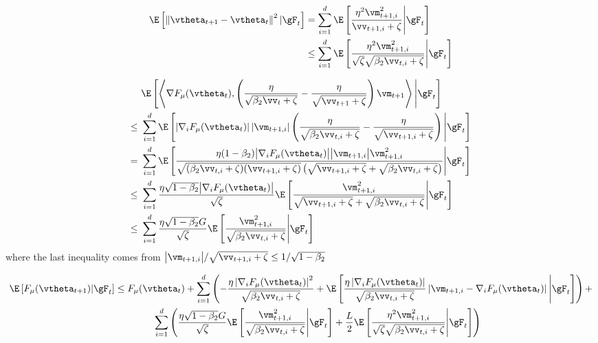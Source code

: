 \begin{equation}
\begin{aligned}
\E\left[\left\|\vtheta_{t+1}-\vtheta_{t}\right\|^2 | \gF_t\right] &= \sum_{i=1}^d \E\left[\frac{\eta^2\vm_{t+1,i}^2}{\vv_{t+1,i}+\zeta} \Bigg| \gF_t\right] \\
&\leq \sum_{i=1}^d \E\left[\frac{\eta^2\vm_{t+1,i}^2}{\sqrt{\zeta}\sqrt{\beta_2\vv_{t,i}+\zeta}} \Bigg| \gF_t\right]
\end{aligned}
\end{equation}

\begin{equation}
\begin{aligned}
&\,\,\E\left[\left\langle\nabla F_{\mu}(\vtheta_t), \left(\frac{\eta}{\sqrt{\beta_2\vv_t + \zeta}} - \frac{\eta}{\sqrt{\vv_{t+1} + \zeta}}\right) \vm_{t+1}\right\rangle \Bigg| \gF_t\right] \\
\leq&\,\,\sum_{i=1}^d\E\left[\left|\nabla_i F_{\mu}(\vtheta_t)\right|\left|\vm_{t+1,i}\right|\left(\frac{\eta}{\sqrt{\beta_2\vv_{t,i} + \zeta}} - \frac{\eta}{\sqrt{\vv_{t+1,i} + \zeta}}\right) \Bigg| \gF_t\right] \\
=&\,\,\sum_{i=1}^d\E\left[ \frac{\eta(1-\beta_2)\big|\nabla_i F_{\mu}(\vtheta_t)\big|\big|\vm_{t+1,i}\big| \vm^2_{t+1,i} }{\sqrt{(\beta_2\vv_{t,i} + \zeta)(\vv_{t+1,i} + \zeta)}\left(\sqrt{\vv_{t+1,i}+\zeta} + \sqrt{\beta_2\vv_{t,i}+\zeta}\right)} \Bigg| \gF_t\right] \\
\leq&\,\,\sum_{i=1}^d\frac{\eta\sqrt{1-\beta_2}\big|\nabla_i F_{\mu}(\vtheta_t)\big|}{\sqrt{\zeta}}\E\left[ \frac{\vm^2_{t+1,i}}{\sqrt{\vv_{t+1,i}+\zeta} + \sqrt{\beta_2\vv_{t,i}+\zeta}} \Bigg| \gF_t\right] \\
\leq&\,\,\sum_{i=1}^d\frac{\eta\sqrt{1-\beta_2}G}{\sqrt{\zeta}}\E\left[ \frac{\vm^2_{t+1,i}}{\sqrt{\beta_2\vv_{t,i}+\zeta}} \Bigg| \gF_t\right]
\end{aligned}
\end{equation}
where the last inequality comes from $\big|\vm_{t+1,i}\big| / \sqrt{\vv_{t+1,i} + \zeta} \leq 1/\sqrt{1-\beta_2}$

\begin{equation}
\begin{aligned}
\E\left[F_{\mu}(\vtheta_{t+1})|\gF_t\right] &\leq F_{\mu}(\vtheta_t) + \sum_{i=1}^d \left(- \frac{\eta\left|\nabla_i F_{\mu}(\vtheta_t)\right|^2}{\sqrt{\beta_2\vv_{t,i} + \zeta}} + \E\left[\frac{\eta\left|\nabla_i F_{\mu}(\vtheta_t)\right|}{\sqrt{\beta_2\vv_{t,i}+\zeta}}\left|\vm_{t+1,i} - \nabla_i F_{\mu}(\vtheta_t)\right|\Bigg| \gF_t\right] \right) + \\
&\qquad \qquad \sum_{i=1}^d \left(\frac{\eta\sqrt{1-\beta_2}G}{\sqrt{\zeta}}\E\left[ \frac{\vm^2_{t+1,i}}{\sqrt{\beta_2\vv_{t,i}+\zeta}} \Bigg| \gF_t\right] +  \frac{L}{2}\E\left[\frac{\eta^2\vm_{t+1,i}^2}{\sqrt{\zeta}\sqrt{\beta_2\vv_{t,i}+\zeta}} \Bigg| \gF_t\right]\right)
\end{aligned}
\end{equation}

